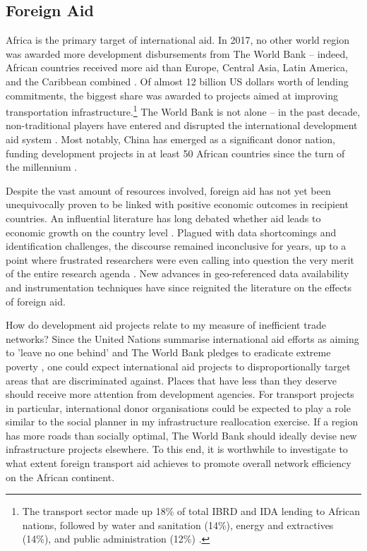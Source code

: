 \documentclass[11pt, oneside]{article}   	%
\begin{document}
\subsection{Foreign Aid}
Africa is the primary target of international aid. In 2017, no other world region was awarded more development disbursements from The World Bank -- indeed, African countries received more aid than Europe, Central Asia, Latin America, and the Caribbean combined \citep{TheWorldBank_WorldBankAnnual_2017}. Of almost 12 billion US dollars worth of lending commitments, the biggest share was awarded to projects aimed at improving transportation infrastructure.\footnote{The transport sector made up 18\% of total IBRD and IDA lending to African nations, followed by water and sanitation (14\%), energy and extractives (14\%), and public administration (12\%) \citep{TheWorldBank_WorldBankAnnual_2017}.} The World Bank is not alone -- in the past decade, non-traditional players have entered and disrupted the international development aid system \citep{Dreher_Rogueaidempirical_2015}. Most notably, China has emerged as a significant donor nation, funding development projects in at least 50 African countries since the turn of the millennium \citep{Strange_TrackingUnderreportedFinancial_2017}.

Despite the vast amount of resources involved, foreign aid has not yet been unequivocally proven to be linked with positive economic outcomes in recipient countries. An influential literature has long debated whether aid leads to economic growth on the country level \citep{Burnside_AidPoliciesGrowth_2000,Easterly_AidPoliciesGrowth_2004,Rajan_Aidgrowthwhat_2008}. Plagued with data shortcomings and identification challenges, the discourse remained inconclusive for years, up to a point where frustrated researchers were even calling into question the very merit of the entire research agenda \citep{Clemens_CountingChickenswhen_2012,Clemens_NewRoleWorld_2016}. New advances in geo-referenced data availability \citep{Dreher_Aidgrowthregional_2015,Dreher_AidChinaGrowth_2017} and instrumentation techniques \citep{Nunn_USFoodAid_2014,Clemens_CountingChickenswhen_2012} have since reignited the literature on the effects of foreign aid.

How do development aid projects relate to my measure of inefficient trade networks? Since the United Nations summarise international aid efforts as aiming to 'leave no one behind' \citep{Briggs_LeavingNoOne_2018} and The World Bank pledges to eradicate extreme poverty \citep{Clemens_NewRoleWorld_2016}, one could expect international aid projects to disproportionally target areas that are discriminated against. Places that have less than they deserve should receive more attention from development agencies. For transport projects in particular, international donor organisations could be expected to play a role similar to the social planner in my infrastructure reallocation exercise. If a region has more roads than socially optimal, The World Bank should ideally devise new infrastructure projects elsewhere. To this end, it is worthwhile to investigate to what extent foreign transport aid achieves to promote overall network efficiency on the African continent.
\end{document}
